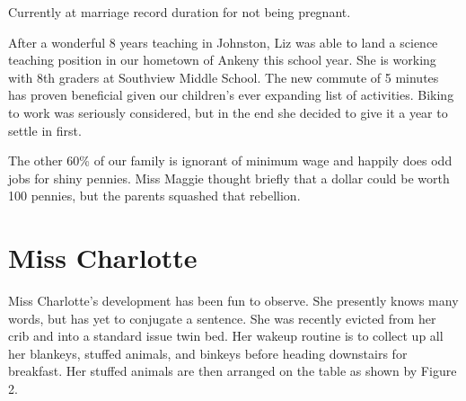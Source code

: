 \documentclass[letterpaper,11pt]{article}
\makeatletter
\newenvironment{figurehere}
  {\def\@captype{figure}}
  {}
\makeatother
\begin{document}
\begin{multicols}{2}
\begin{figurehere}
 \centering   
 \caption{Currently at marriage record duration for not being pregnant.}
\end{figurehere}

After a wonderful 8 years teaching in Johnston, Liz was able to land a
science teaching position in our hometown of Ankeny this school year. She is working
with 8th graders at Southview Middle School.  The new commute of 5 minutes
has proven beneficial given our children's ever expanding list of
activities.  Biking to work was seriously considered, but in the end she
decided to give it a year to settle in first.

The other 60\% of our family is ignorant of minimum wage and happily does odd
jobs for shiny pennies.  Miss Maggie thought briefly that a dollar could be
worth 100 pennies, but the parents squashed that rebellion.

\section{Miss Charlotte}

Miss Charlotte's development has been fun to observe.  She presently knows many
words, but has yet to conjugate a sentence.  She was recently evicted from her
crib and into a standard issue twin bed.  Her wakeup routine is
to collect up all her blankeys, stuffed animals, and binkeys before heading
downstairs for breakfast.  Her stuffed animals are then arranged on the table
as shown by Figure 2.


\end{multicols}
\end{document}
